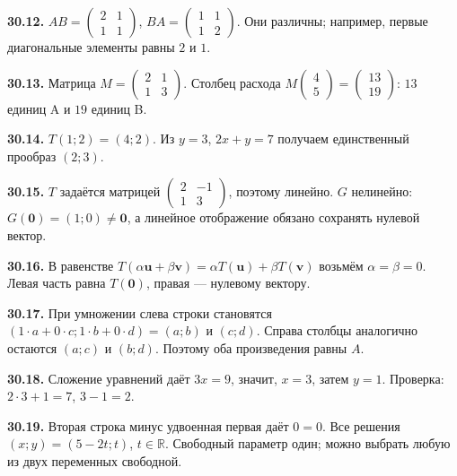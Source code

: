 \documentclass[12pt,a4paper,oneside,openany]{book}
\theoremstyle{colordef}\newtheorem{definition}{Определение}[chapter]
\theoremstyle{plain}\newtheorem{theorem}{Теорема}[chapter]
\theoremstyle{definition}\newtheorem{axiom}{Аксиома}[chapter]
\begin{document}
\textbf{30.12.} \(AB=\begin{pmatrix}2&1\\1&1\end{pmatrix}\), \(BA=\begin{pmatrix}1&1\\1&2\end{pmatrix}\). Они различны; например, первые диагональные элементы равны \(2\) и \(1\).\par
\textbf{30.13.} Матрица \(M=\begin{pmatrix}2&1\\1&3\end{pmatrix}\). Столбец расхода \(M\begin{pmatrix}4\\5\end{pmatrix}=\begin{pmatrix}13\\19\end{pmatrix}\): \(13\) единиц A и \(19\) единиц B.\par
\textbf{30.14.} \(T(1;2)=(4;2)\). Из \(y=3\), \(2x+y=7\) получаем единственный прообраз \((2;3)\).\par
\textbf{30.15.} \(T\) задаётся матрицей \(\begin{pmatrix}2&-1\\1&3\end{pmatrix}\), поэтому линейно. \(G\) нелинейно: \(G(\symbf0)=(1;0)\ne\symbf0\), а линейное отображение обязано сохранять нулевой вектор.\par
\textbf{30.16.} В равенстве \(T(\alpha\symbf u+\beta\symbf v)=\alpha T(\symbf u)+\beta T(\symbf v)\) возьмём \(\alpha=\beta=0\). Левая часть равна \(T(\symbf0)\), правая — нулевому вектору.\par
\textbf{30.17.} При умножении слева строки становятся \((1\cdot a+0\cdot c;1\cdot b+0\cdot d)=(a;b)\) и \((c;d)\). Справа столбцы аналогично остаются \((a;c)\) и \((b;d)\). Поэтому оба произведения равны \(A\).\par
\textbf{30.18.} Сложение уравнений даёт \(3x=9\), значит, \(x=3\), затем \(y=1\). Проверка: \(2\cdot3+1=7\), \(3-1=2\).\par
\textbf{30.19.} Вторая строка минус удвоенная первая даёт \(0=0\). Все решения \((x;y)=(5-2t;t)\), \(t\in\mathbb R\). Свободный параметр один; можно выбрать любую из двух переменных свободной.\par
\end{document}
